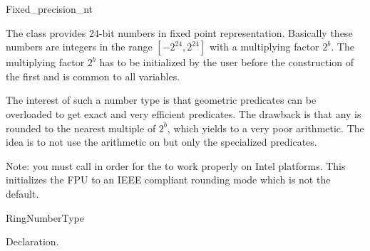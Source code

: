 
%
%
%
%

\begin{ccRefClass}{Fixed_precision_nt}

\label{I1_Chapter_Fixed_precision_nt}

\ccDefinition

The class  provides 24-bit numbers in 
fixed point representation.
Basically these numbers are integers in the range
$[-2^{24},2^{24}]$ with a multiplying factor $2^b$.
The multiplying factor $2^b$ has to be initialized by the user
before the construction of the first 
and is common to all variables.

The interest of such a number type is that geometric predicates
can be overloaded to get exact and very efficient predicates.
The drawback is that any  is rounded to 
the nearest multiple of $2^b$, which yields to a very poor arithmetic.
The idea is to not use the arithmetic on 
but only the specialized predicates.

Note: you must call  in order for the
 to work properly on Intel platforms.  This
initializes the FPU to an IEEE compliant rounding mode which is not the
default.

\ccSetTwoColumns{}{\hspace*{8.5cm}}


\ccIsModel
RingNumberType

\ccCreation
{}
            {Declaration.}


\end{ccRefClass}
